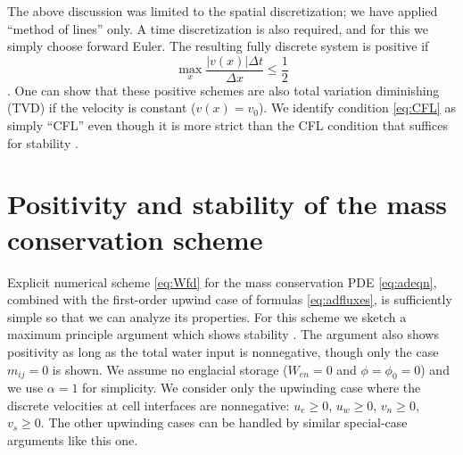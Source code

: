 \documentclass[11pt,final]{amsart}
\begin{document}
The above discussion was limited to the spatial discretization; we have applied ``method of lines'' only.  A time discretization is also required, and for this we simply choose forward Euler.  The resulting fully discrete system is positive if
\begin{equation}
\max_x \frac{|v(x)|\Delta t}{\Delta x} \le \frac{1}{2} \label{eq:CFL}
\end{equation}
\citep[section III.1.1]{HundsdorferVerwer2010}.  One can show that these positive schemes are also total variation diminishing (TVD) if the velocity is constant ($v(x)=v_0$).  We identify condition \eqref{eq:CFL} as simply ``CFL'' even though it is more strict than the CFL condition that suffices for stability \citep{MortonMayers}.


\section{Positivity and stability of the mass conservation scheme} \label{app:positivestable}

Explicit numerical scheme \eqref{eq:Wfd} for the mass conservation PDE \eqref{eq:adeqn}, combined with the first-order upwind case of formulas \eqref{eq:adfluxes}, is sufficiently simple so that we can analyze its properties.  For this scheme we sketch a maximum principle argument which shows stability \citep{MortonMayers}.  The argument also shows positivity \citep{HundsdorferVerwer2010} as long as the total water input is nonnegative, though only the case $m_{ij} = 0$ is shown.  We assume no englacial storage ($W_{en}=0$ and $\phi=\phi_0=0$) and we use $\alpha=1$ for simplicity.  We consider only the upwinding case where the discrete velocities at cell interfaces are nonnegative: $u_e\ge 0$, $u_w\ge 0$, $v_n\ge 0$, $v_s\ge 0$.  The other upwinding cases can be handled by similar special-case arguments like this one.
\end{document}
